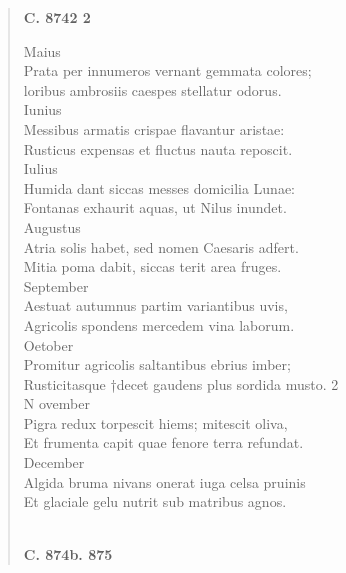 \documentclass[11pt, a4paper]{report}
\begin{document}
\begin{verse}
    \begin{center} \textbf{C. 8742 2} \end{center} \marginpar{[324]} Maius \\ Prata per innumeros vernant gemmata colores; \\ loribus ambrosiis caespes stellatur odorus. \\ Iunius \\ Messibus armatis crispae flavantur aristae: \\ Rusticus expensas et fluctus nauta reposcit. \\ Iulius \\ Humida dant siccas messes domicilia Lunae: \\ Fontanas exhaurit aquas, ut Nilus inundet. \\ Augustus \\ Atria solis habet, sed nomen Caesaris adfert. \\ Mitia poma dabit, siccas terit area fruges. \\ September \\ Aestuat autumnus partim variantibus uvis, \\ Agricolis spondens mercedem vina laborum. \\ Oetober \\ Promitur agricolis saltantibus ebrius imber; \\ Rusticitasque †decet gaudens plus sordida musto. 2 \\ N ovember \\ Pigra redux torpescit hiems; mitescit oliva, \\ Et frumenta capit quae fenore terra refundat. \\ December \\ Algida bruma nivans onerat iuga celsa pruinis \\ Et glaciale gelu nutrit sub matribus agnos. \\ 
        ﻿\pagebreak 
    \begin{center} \textbf{C. 874b. 875} \end{center} \marginpar{[325]} 
      \end{verse}
  
\end{document}
